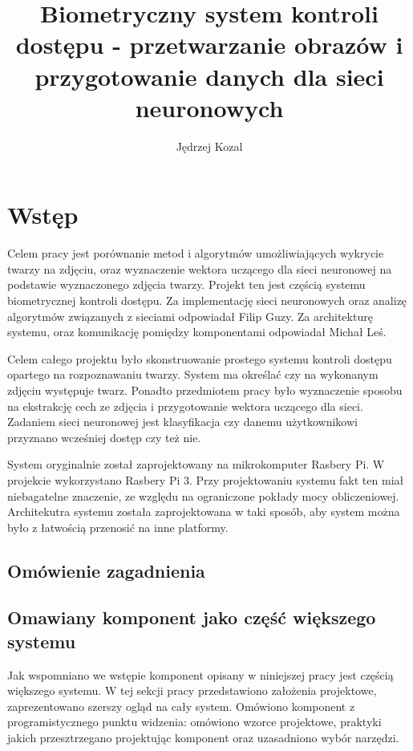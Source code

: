\documentclass[oneside, eng]{mgr}
\title{Biometryczny system kontroli dostępu - przetwarzanie obrazów i przygotowanie danych dla sieci neuronowych}
\author{Jędrzej Kozal}
\begin{document}


\maketitle

\linespread{1.5}

\chapter{Wstęp}
Celem pracy jest porównanie metod i algorytmów umożliwiających wykrycie twarzy na zdjęciu, oraz wyznaczenie wektora uczącego dla sieci neuronowej na podstawie wyznaczonego zdjęcia twarzy. Projekt ten jest częścią systemu biometrycznej kontroli dostępu. Za implementację sieci neuronowych oraz analizę algorytmów związanych z sieciami odpowiadał Filip Guzy. Za architekturę systemu, oraz komunikację pomiędzy komponentami odpowiadał Michał Leś. 

Celem całego projektu było skonstruowanie prostego systemu kontroli dostępu opartego na rozpoznawaniu twarzy. System ma określać czy na wykonanym zdjęciu występuje twarz. Ponadto przedmiotem pracy było wyznaczenie sposobu na ekstrakcję cech ze zdjęcia i przygotowanie wektora uczącego dla sieci. Zadaniem sieci neuronowej jest klasyfikacja czy danemu użytkownikowi przyznano wcześniej dostęp czy też nie.

System oryginalnie został zaprojektowany na mikrokomputer Rasbery Pi. W projekcie wykorzystano Rasbery Pi 3. Przy projektowaniu systemu fakt ten miał niebagatelne znaczenie, ze względu na ograniczone pokłady mocy obliczeniowej. Architekutra systemu została zaprojektowana w taki sposób, aby system można było z łatwością przenosić na inne platformy. 


\section{Omówienie zagadnienia}

\section{Omawiany komponent jako część większego systemu} 

Jak wspomniano we wstępie komponent opisany w niniejszej pracy jest częścią większego systemu. W tej sekcji pracy przedstawiono założenia projektowe, zaprezentowano szerszy ogląd na cały system. Omówiono komponent z programistycznego punktu widzenia: omówiono wzorce projektowe, praktyki jakich przesztrzegano projektując komponent oraz uzasadniono wybór narzędzi.
\end{document}
